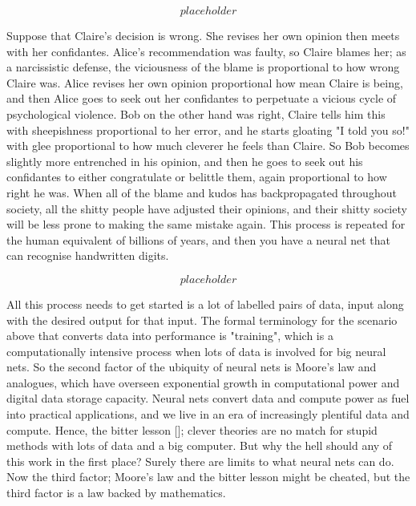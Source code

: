 \begin{fullwidth}
\[placeholder\]

Suppose that Claire's decision is wrong. She revises her own opinion then meets with her confidantes. Alice's recommendation was faulty, so Claire blames her; as a narcissistic defense, the viciousness of the blame is proportional to how wrong Claire was. Alice revises her own opinion proportional how mean Claire is being, and then Alice goes to seek out her confidantes to perpetuate a vicious cycle of psychological violence. Bob on the other hand was right, Claire tells him this with sheepishness proportional to her error, and he starts gloating "I told you so!" with glee proportional to how much cleverer he feels than Claire. So Bob becomes slightly more entrenched in his opinion, and then he goes to seek out his confidantes to either congratulate or belittle them, again proportional to how right he was. When all of the blame and kudos has backpropagated throughout society, all the shitty people have adjusted their opinions, and their shitty society will be less prone to making the same mistake again. This process is repeated for the human equivalent of billions of years, and then you have a neural net that can recognise handwritten digits.

\[placeholder\]

All this process needs to get started is a lot of labelled pairs of data, input along with the desired output for that input. The formal terminology for the scenario above that converts data into performance is "training", which is a computationally intensive process when lots of data is involved for big neural nets. So the second factor of the ubiquity of neural nets is Moore's law and analogues, which have overseen exponential growth in computational power and digital data storage capacity. Neural nets convert data and compute power as fuel into practical applications, and we live in an era of increasingly plentiful data and compute. Hence, the bitter lesson []; clever theories are no match for stupid methods with lots of data and a big computer. But why the hell should any of this work in the first place? Surely there are limits to what neural nets can do. Now the third factor; Moore's law and the bitter lesson might be cheated, but the third factor is a law backed by mathematics.

\begin{theorem}

\end{theorem}


\end{fullwidth}
